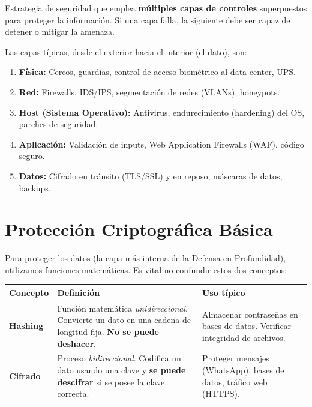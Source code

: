 \documentclass[11pt,a4paper]{article}
\begin{document}
\begin{definicion}
Estrategia de seguridad que emplea \textbf{múltiples capas de controles} superpuestos para proteger la información. Si una capa falla, la siguiente debe ser capaz de detener o mitigar la amenaza.
\end{definicion}

Las capas típicas, desde el exterior hacia el interior (el dato), son:
\begin{enumerate}[leftmargin=*]
  \item \textbf{Física:} Cercos, guardias, control de acceso biométrico al data center, UPS.
  \item \textbf{Red:} Firewalls, IDS/IPS, segmentación de redes (VLANs), honeypots.
  \item \textbf{Host (Sistema Operativo):} Antivirus, endurecimiento (hardening) del OS, parches de seguridad.
  \item \textbf{Aplicación:} Validación de inputs, Web Application Firewalls (WAF), código seguro.
  \item \textbf{Datos:} Cifrado en tránsito (TLS/SSL) y en reposo, máscaras de datos, backups.
\end{enumerate}

\section{Protección Criptográfica Básica}
Para proteger los datos (la capa más interna de la Defensa en Profundidad), utilizamos funciones matemáticas. Es vital no confundir estos dos conceptos:

\begin{center}
\renewcommand{\arraystretch}{1.35}
\begin{tabularx}{\textwidth}{@{} p{2.5cm} X X @{}}
\toprule
\textbf{Concepto} & \textbf{Definición} & \textbf{Uso típico} \\
\midrule
\textbf{Hashing} & Función matemática \textit{unidireccional}. Convierte un dato en una cadena de longitud fija. \textbf{No se puede deshacer}. & Almacenar contraseñas en bases de datos. Verificar integridad de archivos. \\
\textbf{Cifrado} & Proceso \textit{bidireccional}. Codifica un dato usando una clave y \textbf{se puede descifrar} si se posee la clave correcta. & Proteger mensajes (WhatsApp), bases de datos, tráfico web (HTTPS). \\
\bottomrule
\end{tabularx}
\end{center}
\end{document}
